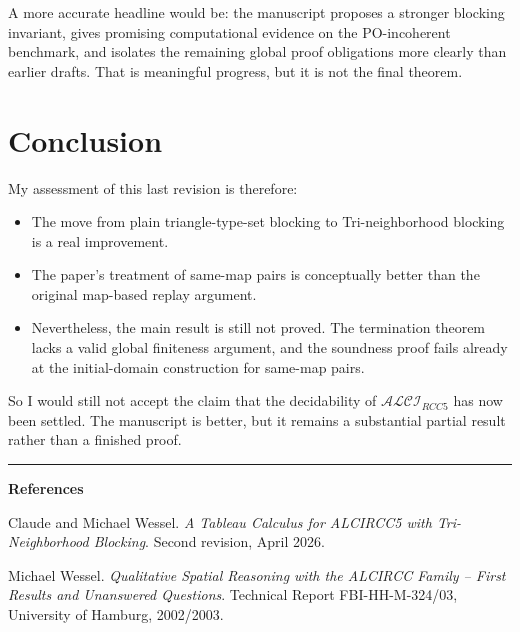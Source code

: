 \documentclass[11pt]{article}
\newcommand{\ALCIRCC}{\ensuremath{\mathcal{ALCI}_{RCC5}}}
\begin{document}
A more accurate headline would be: the manuscript proposes a stronger blocking invariant,
gives promising computational evidence on the PO-incoherent benchmark, and isolates the
remaining global proof obligations more clearly than earlier drafts. That is meaningful progress,
but it is not the final theorem.

\section{Conclusion}

My assessment of this last revision is therefore:
\begin{itemize}
    \item The move from plain triangle-type-set blocking to Tri-neighborhood blocking is a real
    improvement.
    \item The paper's treatment of same-map pairs is conceptually better than the original
    map-based replay argument.
    \item Nevertheless, the main result is still not proved. The termination theorem lacks a
    valid global finiteness argument, and the soundness proof fails already at the initial-domain
    construction for same-map pairs.
\end{itemize}

So I would still not accept the claim that the decidability of \ALCIRCC{} has now been
settled. The manuscript is better, but it remains a substantial partial result rather than a
finished proof.

\vspace{10pt}
\hrule
\vspace{8pt}

\noindent\textbf{References}

\begin{enumerate}[label={[\arabic*]},leftmargin=2.2em]
    \item Claude and Michael Wessel. \emph{A Tableau Calculus for ALCIRCC5 with
    Tri-Neighborhood Blocking}. Second revision, April 2026.
    \item Michael Wessel. \emph{Qualitative Spatial Reasoning with the ALCIRCC Family --
    First Results and Unanswered Questions}. Technical Report FBI-HH-M-324/03,
    University of Hamburg, 2002/2003.
\end{enumerate}
\end{document}
